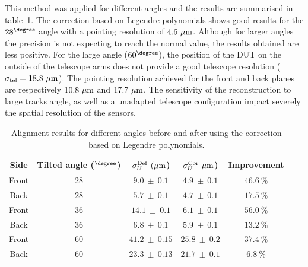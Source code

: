       This method was applied for different angles and the results are summarised in table~\ref{tab:correctionOfDeformation}. 
      The correction based on Legendre polynomials shows good results for the $28^{\degree}$ angle with a pointing resolution of $4.6~\rm{\mu m}$.
      Although for larger angles the precision is not expecting to reach the normal value, the results obtained are less positive.
      For the large angle ($60^{\degree}$), the position of the \gls{DUT} on the outside of the telescope arms does not provide a good telescope resolution ($\sigma_{\rm{tel}} = 18.8~\rm{\mu m}$).
      The pointing resolution achieved for the front and back planes are respectively $10.8~\rm{\mu m}$ and $17.7~\rm{\mu m}$.
      The sensitivity of the reconstruction to large tracks angle, as well as a unadapted telescope configuration impact severely the spatial resolution of the sensors.

      \begin{table}[!h]
        \centering
        \begin{tabular}{c c c c c}
          \hline %
          Side &  Tilted angle ($^{\degree}$)  &   $\sigma_{U}^{\rm{Def}}~(\rm{\mu m}$) &   $\sigma_{U}^{\rm{Cor}}~\rm{\mu m}$) & Improvement \\
          \hline %
          \hline %
          Front &      28       & $ 9.0 \ \pm \ 0.1 $ & $ 4.9 \ \pm \ 0.1 $ &    $46.6 \ \%$  \tabularnewline
          Back  &      28       & $ 5.7 \ \pm \ 0.1 $ & $ 4.7 \ \pm \ 0.1 $ &    $17.5 \ \%$  \tabularnewline
          \hline %
          Front &      36       & $ 14.1 \ \pm \ 0.1 $ & $ 6.1 \ \pm \ 0.1 $ &    $56.0 \ \%$ \tabularnewline
          Back  &      36       & $ 6.8 \ \pm \ 0.1 $ & $ 5.9 \ \pm \ 0.1 $ &    $13.2 \ \%$  \tabularnewline
          \hline %
          Front &      60       & $ 41.2 \ \pm \ 0.15$ & $25.8 \ \pm \ 0.2$  &    $37.4 \ \%$ \tabularnewline
          Back  &      60       & $ 23.3 \ \pm \ 0.13$ & $21.7 \ \pm \ 0.1$  &    $6.8 \ \%$  \tabularnewline
          \hline %
        \end{tabular}
        \caption{Alignment results for different angles before and after using the correction based on Legendre polynomials.}
        \label{tab:correctionOfDeformation}
      \end{table}

